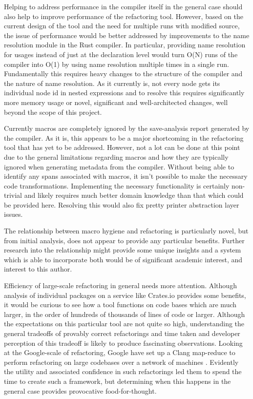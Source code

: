 Helping to address performance in the compiler itself in the general case should also help to improve performance of the refactoring tool. However, based on the current design of the tool and the need for multiple runs with modified source, the issue of performance would be better addressed by improvements to the name resolution module in the Rust compiler. In particular, providing name resolution for usages instead of just at the declaration level would turn O(N) runs of the compiler into O(1) by using name resolution multiple times in a single run. Fundamentally this requires heavy changes to the structure of the compiler and the nature of name resolution. As it currently is, not every node gets its individual node id in nested expressions and to resolve this requires significantly more memory usage or novel, significant and well-architected changes, well beyond the scope of this project.

Currently macros are completely ignored by the save-analysis report generated by the compiler. As it is, this appears to be a major shortcoming in the refactoring tool that has yet to be addressed. However, not a lot can be done at this point due to the general limitations regarding macros and how they are typically ignored when generating metadata from the compiler. Without being able to identify any spans associated with macros, it isn't possible to make the necessary code transformations. Implementing the necessary functionality is certainly non-trivial and likely requires much better domain knowledge than that which could be provided here. Resolving this would also fix pretty printer abstraction layer issues.

The relationship between macro hygiene and refactoring is particularly novel, but from initial analysis, does not appear to provide any particular benefits. Further research into the relationship might provide some unique insights and a system which is able to incorporate both would be of significant academic interest, and interest to this author.

Efficiency of large-scale refactoring in general needs more attention. Although analysis of individual packages on a service like Crates.io provides some benefits, it would be curious to see how a tool functions on code bases which are much larger, in the order of hundreds of thousands of lines of code or larger. Although the expectations on this particular tool are not quite so high, understanding the general tradeoffs of provably correct refactorings and time taken and developer perception of this tradeoff is likely to produce fascinating observations. Looking at the Google-scale of refactoring, Google have set up a Clang map-reduce to perform refactoring on large codebases over a network of machines \cite{carruth2011clang}. Evidently the utility and associated confidence in such refactorings led them to spend the time to create such a framework, but determining when this happens in the general case provides provocative food-for-thought.